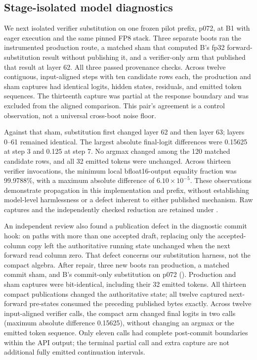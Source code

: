 \documentclass[conference]{IEEEtran}
\begin{document}
\subsection{Stage-isolated model diagnostics}
\label{sec:e7b-diagnostic}
We next isolated verifier substitution on one frozen pilot prefix, p072, at B1 with eager execution and the same pinned FP8 stack. Three separate boots ran the instrumented production route, a matched sham that computed B's fp32 forward-substitution result without publishing it, and a verifier-only arm that published that result at layer 62. All three passed provenance checks. Across twelve contiguous, input-aligned steps with ten candidate rows each, the production and sham captures had identical logits, hidden states, residuals, and emitted token sequences. The thirteenth capture was partial at the response boundary and was excluded from the aligned comparison. This pair's agreement is a control observation, not a universal cross-boot noise floor.

Against that sham, substitution first changed layer 62 and then layer 63; layers 0--61 remained identical. The largest absolute final-logit differences were 0.15625 at step 3 and 0.125 at step 7. No argmax changed among the 120 matched candidate rows, and all 32 emitted tokens were unchanged. Across thirteen verifier invocations, the minimum local bfloat16-output equality fraction was 99.9788\%, with a maximum absolute difference of $6.10\times10^{-5}$. These observations demonstrate propagation in this implementation and prefix, without establishing model-level harmlessness or a defect inherent to either published mechanism. Raw captures and the independently checked reduction are retained under .

An independent review also found a publication defect in the diagnostic commit hook: on paths with more than one accepted draft, replacing only the accepted-column copy left the authoritative running state unchanged when the next forward read column zero. That defect concerns our substitution harness, not the compact algebra. After repair, three new boots ran production, a matched commit sham, and B's commit-only substitution on p072 (). Production and sham captures were bit-identical, including their 32 emitted tokens. All thirteen compact publications changed the authoritative state; all twelve captured next-forward pre-states consumed the preceding published bytes exactly. Across twelve input-aligned verifier calls, the compact arm changed final logits in two calls (maximum absolute difference 0.15625), without changing an argmax or the emitted token sequence. Only eleven calls had complete post-commit boundaries within the API output; the terminal partial call and extra capture are not additional fully emitted continuation intervals.
\end{document}
